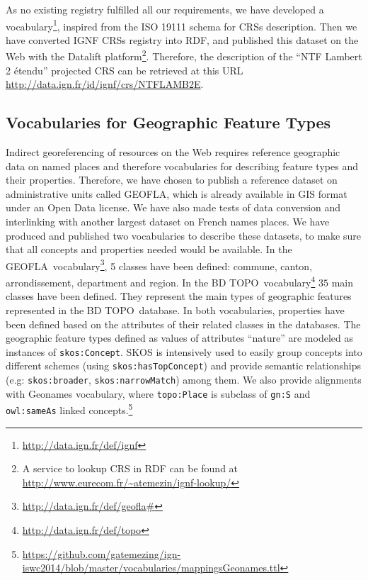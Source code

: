 As no existing registry fulfilled all our requirements, we have developed a vocabulary\footnote{\url{http://data.ign.fr/def/ignf}}, inspired from the ISO 19111 schema for CRSs description. Then we have converted IGNF CRSs registry into RDF, and published this dataset on the Web with the Datalift platform\footnote{A service to lookup CRS in RDF can be found at \url{http://www.eurecom.fr/~atemezin/ignf-lookup/}}. Therefore, the description of the ``NTF Lambert 2 \'{e}tendu'' projected CRS can be retrieved at this URL \url{http://data.ign.fr/id/ignf/crs/NTFLAMB2E}.

\subsection{Vocabularies for Geographic Feature Types}
\label{sec:}

Indirect georeferencing of resources on the Web requires reference geographic data on named places and therefore vocabularies for describing feature types and their properties. Therefore, we have chosen to publish a reference dataset on administrative units called GEOFLA\circledR, which is already available in GIS format under an Open Data license. We have also made tests of data conversion and interlinking with another largest dataset on French names places. We have produced and published two vocabularies to describe these datasets, to make sure that all concepts and properties needed would be available.
In the GEOFLA\circledR ~vocabulary\footnote{\url{http://data.ign.fr/def/geofla#}}, 5 classes have been defined: commune, canton, arrondissement, department and region. In the BD TOPO\circledR ~vocabulary\footnote{\url{http://data.ign.fr/def/topo}} $35$ main classes have been defined. They represent the main types of geographic features represented in the BD TOPO\circledR ~database. In both vocabularies, properties have been defined based on the attributes of their related classes in the databases. The geographic feature types defined as values of attributes ``nature'' are modeled as instances of \texttt{skos:Concept}. SKOS is intensively used to easily group concepts into different schemes (using \texttt{skos:hasTopConcept}) and provide semantic relationships (e.g: \texttt{skos:broader}, \texttt{skos:narrowMatch}) among them. We also provide alignments with Geonames vocabulary, where \texttt{topo:Place} is subclass of \texttt{gn:S} and \texttt{owl:sameAs} linked concepts.\footnote{\url{https://github.com/gatemezing/ign-iswc2014/blob/master/vocabularies/mappingsGeonames.ttl}} 

